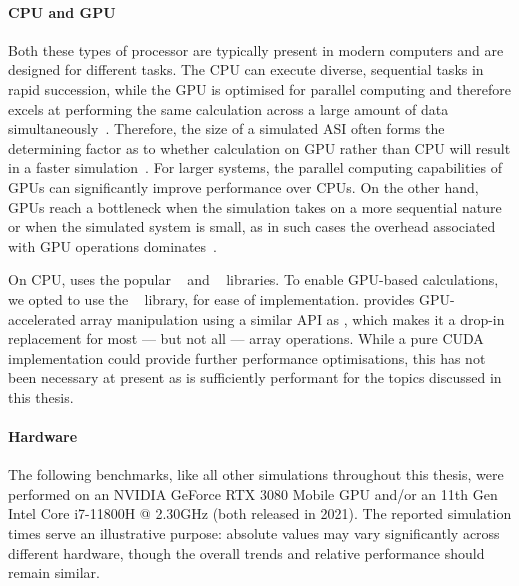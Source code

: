 \paragraph{CPU and GPU}
Both these types of processor are typically present in modern computers and are designed for different tasks.
The CPU can execute diverse, sequential tasks in rapid succession, while the GPU is optimised for parallel computing and therefore excels at performing the same calculation across a large amount of data simultaneously~\cite{owens2008gpu}.
Therefore, the size of a simulated ASI often forms the determining factor as to whether calculation on GPU rather than CPU will result in a faster simulation~\cite{lee2010debunking}.
For larger systems, the parallel computing capabilities of GPUs can significantly improve performance over CPUs.
On the other hand, GPUs reach a bottleneck when the simulation takes on a more sequential nature or when the simulated system is small, as in such cases the overhead associated with GPU operations dominates~\cite{owens2008gpu}. \par
On CPU, \hotspice uses the popular ~\cite{NumPy} and ~\cite{SciPy} libraries.
To enable GPU-based calculations, we opted to use the ~\cite{CuPy} library, for ease of implementation.
 provides GPU-accelerated array manipulation using a similar API as , which makes it a drop-in replacement for most --- but not all --- array operations.
While a pure CUDA implementation could provide further performance optimisations, this has not been necessary at present as  is sufficiently performant for the topics discussed in this thesis.

\paragraph{Hardware}\label{hardware}
The following benchmarks, like all other simulations throughout this thesis, were performed on an NVIDIA GeForce RTX 3080 Mobile GPU and/or an 11th Gen Intel\textregistered{} Core\texttrademark{} i7-11800H @ 2.30GHz (both released in 2021).
The reported simulation times serve an illustrative purpose: absolute values may vary significantly across different hardware, though the overall trends and relative performance should remain similar. \par


